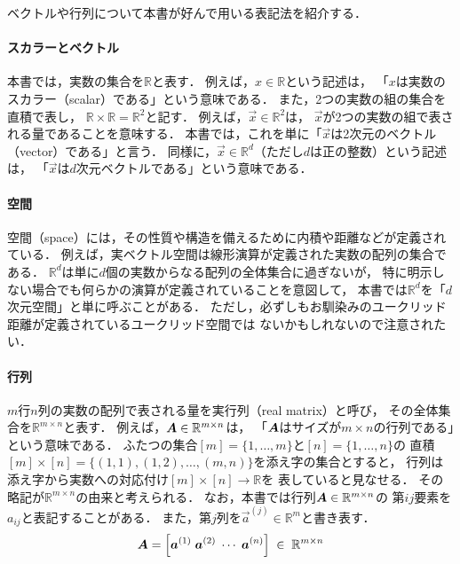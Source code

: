 



\label{sec:notation}

ベクトルや行列について本書が好んで用いる表記法を紹介する．


\paragraph{スカラーとベクトル}
本書では，実数の集合を$\mathbb{R}$と表す．
例えば，$x\in\mathbb{R}$という記述は，
「$x$は実数のスカラー（scalar）である」という意味である．
また，2つの実数の組の集合を直積で表し，
$\mathbb{R}\times\mathbb{R}=\mathbb{R}^2$と記す．
例えば，$\vec x\in\mathbb{R}^2$は，
$\vec x$が2つの実数の組で表される量であることを意味する．
本書では，これを単に「$\vec x$は2次元のベクトル（vector）である」と言う．
同様に，$\vec x\in\mathbb{R}^d$（ただし$d$は正の整数）という記述は，
「$\vec x$は$d$次元ベクトルである」という意味である．

\paragraph{空間}
空間（space）には，その性質や構造を備えるために内積や距離などが定義されている．
例えば，実ベクトル空間は線形演算が定義された実数の配列の集合である．
$\mathbb{R}^d$は単に$d$個の実数からなる配列の全体集合に過ぎないが，
特に明示しない場合でも何らかの演算が定義されていることを意図して，
本書では$\mathbb{R}^d$を「$d$次元空間」と単に呼ぶことがある．
ただし，必ずしもお馴染みのユークリッド距離が定義されているユークリッド空間では
ないかもしれないので注意されたい．

\paragraph{行列}
$m$行$n$列の実数の配列で表される量を実行列（real matrix）と呼び，
その全体集合を$\mathbb{R}^{m\times n}$と表す．
例えば，$\mbox{\boldmath $A$}\in\mathbb{R}^{m\times n}$は，
「$\mbox{\boldmath $A$}$はサイズが$m\times n$の行列である」という意味である．
ふたつの集合$[m]=\{1,\dots,m\}$と$[n]=\{1,\dots,n\}$の
直積$[m]\times[n]=\{(1,1),(1,2),\dots,(m,n)\}$を添え字の集合とすると，
行列は添え字から実数への対応付け$[m]\times[n]\rightarrow\mathbb{R}$を
表していると見なせる．
その略記が$\mathbb{R}^{m\times n}$の由来と考えられる．
なお，本書では行列$\mbox{\boldmath $A$}\in\mathbb{R}^{m\times n}$の
第$ij$要素を$a_{ij}$と表記することがある．
また，第$j$列を$\vec a^{(j)}\in\mathbb{R}^m$と書き表す．
\[
 \mbox{\boldmath $A$}=\left[\mbox{\boldmath $a$}^{(1)}\;\mbox{\boldmath $a$}^{(2)}\;\cdots\;\mbox{\boldmath $a$}^{(n)}\right]\;\in\;\mathbb{R}^{m\times n}
\]


